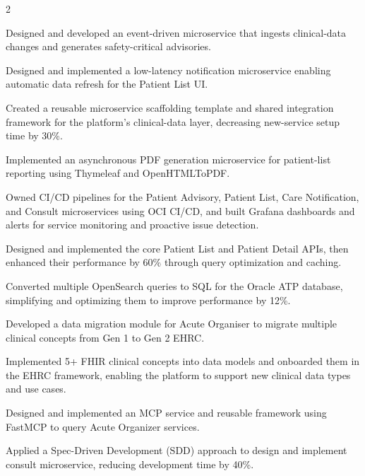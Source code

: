 \documentclass[]{hieudo-build}
\begin{document}
\begin{paracol}{2}
\begin{tightemize}
 \item Designed and developed an event-driven microservice that ingests clinical-data changes and generates safety-critical advisories.
 \item Designed and implemented a low-latency notification microservice enabling automatic data refresh for the Patient List UI.
 \item Created a reusable microservice scaffolding template and shared integration framework for the platform's clinical-data layer, decreasing new-service setup time by 30\%.
 \item Implemented an asynchronous PDF generation microservice for patient-list reporting using Thymeleaf and OpenHTMLToPDF.
 \item Owned CI/CD pipelines for the Patient Advisory, Patient List, Care Notification, and Consult microservices using OCI CI/CD, and built Grafana dashboards and alerts for service monitoring and proactive issue detection.
 \item Designed and implemented the core Patient List and Patient Detail APIs, then enhanced their performance by 60\% through query optimization and caching.
 \item Converted multiple OpenSearch queries to SQL for the Oracle ATP database, simplifying and optimizing them to improve performance by 12\%.
 \item Developed a data migration module for Acute Organiser to migrate multiple clinical concepts from Gen 1 to Gen 2 EHRC.
 \item Implemented 5+ FHIR clinical concepts into data models and onboarded them in the EHRC framework, enabling the platform to support new clinical data types and use cases.
 \item Designed and implemented an MCP service and reusable framework using FastMCP to query Acute Organizer services.
 \item Applied a Spec-Driven Development (SDD) approach to design and implement consult microservice, reducing development time by 40\%.
\end{tightemize}
\sectionsep

\\


\end{paracol}
\end{document}
